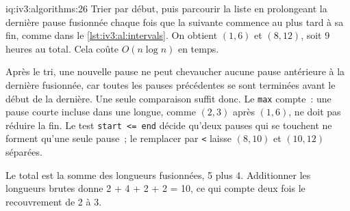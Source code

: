 \begin{solution}{iq:iv3:algorithms:26}
Trier par début, puis parcourir la liste en prolongeant la dernière pause fusionnée chaque fois que la suivante commence au plus tard à sa fin, comme dans le \cref{lst:iv3:al:intervals}. On obtient $(1, 6)$ et $(8, 12)$, soit 9 heures au total. Cela coûte $O(n \log n)$ en temps.
\label{lst:iv3:al:intervals}

Après le tri, une nouvelle pause ne peut chevaucher aucune pause antérieure à la dernière fusionnée, car toutes les pauses précédentes se sont terminées avant le début de la dernière. Une seule comparaison suffit donc. Le \texttt{max} compte~: une pause courte incluse dans une longue, comme $(2, 3)$ après $(1, 6)$, ne doit pas réduire la fin. Le test \texttt{start <= end} décide qu'deux pauses qui se touchent ne forment qu'une seule pause~; le remplacer par \texttt{<} laisse $(8, 10)$ et $(10, 12)$ séparées.

Le total est la somme des longueurs fusionnées, 5 plus 4. Additionner les longueurs brutes donne 2 + 4 + 2 + 2 = 10, ce qui compte deux fois le recouvrement de 2 à 3.

\end{solution}

